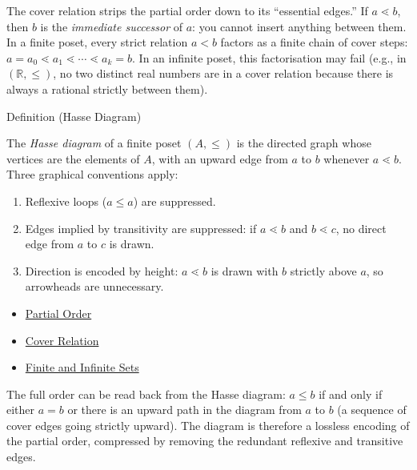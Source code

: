 \begin{remark*}[Intuition]
\label{rem:cover-intuition}
The cover relation strips the partial order down to its ``essential edges.''
If $a \lessdot b$, then $b$ is the \emph{immediate successor} of $a$: you
cannot insert anything between them.  In a finite poset, every strict
relation $a < b$ factors as a finite chain of cover steps:
$a = a_0 \lessdot a_1 \lessdot \cdots \lessdot a_k = b$.  In an infinite
poset, this factorisation may fail (e.g., in $(\mathbb{R}, \leq)$, no two
distinct real numbers are in a cover relation because there is always a
rational strictly between them).
\end{remark*}


\begin{definitionbox}{Definition (Hasse Diagram)}
\begin{definition}\label{def:hasse}
The \emph{Hasse diagram} of a finite poset $(A, \leq)$ is the directed graph
whose vertices are the elements of $A$, with an upward edge from $a$ to $b$
whenever $a \lessdot b$.  Three graphical conventions apply:
\begin{enumerate}[label=(\roman*)]
  \item Reflexive loops ($a \leq a$) are suppressed.
  \item Edges implied by transitivity are suppressed: if $a \lessdot b$ and
        $b \lessdot c$, no direct edge from $a$ to $c$ is drawn.
  \item Direction is encoded by height: $a \lessdot b$ is drawn with $b$
        strictly above $a$, so arrowheads are unnecessary.
\end{enumerate}
\end{definition}
\end{definitionbox}

\begin{dependencies}
\begin{itemize}
  \item \hyperref[def:partial-order]{Partial Order}
  \item \hyperref[def:cover-relation]{Cover Relation}
  \item \hyperref[def:finite-infinite]{Finite and Infinite Sets}
\end{itemize}
\end{dependencies}

\begin{remark*}
\label{rem:hasse-recovery}
The full order can be read back from the Hasse diagram: $a \leq b$ if and
only if either $a = b$ or there is an upward path in the diagram from $a$ to
$b$ (a sequence of cover edges going strictly upward).  The diagram is therefore
a lossless encoding of the partial order, compressed by removing the redundant
reflexive and transitive edges.
\end{remark*}

